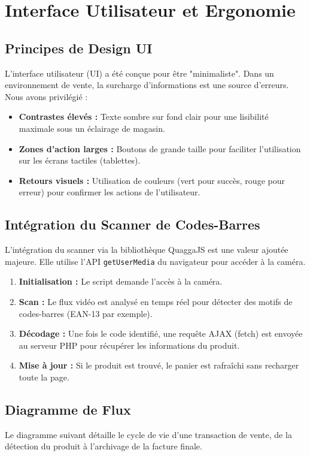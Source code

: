 \documentclass[12pt,a4paper]{report}
\begin{document}
\chapter{Interface Utilisateur et Ergonomie}
\section{Principes de Design UI}
L'interface utilisateur (UI) a été conçue pour être "minimaliste". Dans un environnement de vente, la surcharge d'informations est une source d'erreurs. Nous avons privilégié :
\begin{itemize}
    \item \textbf{Contrastes élevés :} Texte sombre sur fond clair pour une lisibilité maximale sous un éclairage de magasin.
    \item \textbf{Zones d'action larges :} Boutons de grande taille pour faciliter l'utilisation sur les écrans tactiles (tablettes).
    \item \textbf{Retours visuels :} Utilisation de couleurs (vert pour succès, rouge pour erreur) pour confirmer les actions de l'utilisateur.
\end{itemize}

\section{Intégration du Scanner de Codes-Barres}
L'intégration du scanner via la bibliothèque QuaggaJS est une valeur ajoutée majeure. Elle utilise l'API \texttt{getUserMedia} du navigateur pour accéder à la caméra. 
\begin{enumerate}
    \item \textbf{Initialisation :} Le script demande l'accès à la caméra.
    \item \textbf{Scan :} Le flux vidéo est analysé en temps réel pour détecter des motifs de codes-barres (EAN-13 par exemple).
    \item \textbf{Décodage :} Une fois le code identifié, une requête AJAX (fetch) est envoyée au serveur PHP pour récupérer les informations du produit.
    \item \textbf{Mise à jour :} Si le produit est trouvé, le panier est rafraîchi sans recharger toute la page.
\end{enumerate}

\section{Diagramme de Flux}
Le diagramme suivant détaille le cycle de vie d'une transaction de vente, de la détection du produit à l'archivage de la facture finale.
\end{document}
